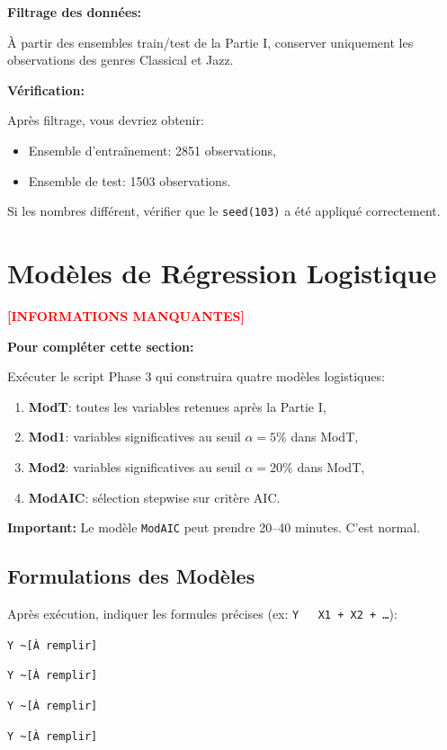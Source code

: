 \documentclass[11pt,a4paper,french]{report}
\begin{document}
\textbf{Filtrage des données:}

À partir des ensembles train/test de la Partie I, conserver uniquement les observations des genres Classical et Jazz.

\textbf{Vérification:}

Après filtrage, vous devriez obtenir:
\begin{itemize}
    \item Ensemble d'entraînement: 2851 observations,
    \item Ensemble de test: 1503 observations.
\end{itemize}

Si les nombres différent, vérifier que le \texttt{seed(103)} a été appliqué correctement.

\section{Modèles de Régression Logistique}

\textcolor{red}{\textbf{[INFORMATIONS MANQUANTES]}}

\textbf{Pour compléter cette section:}

Exécuter le script Phase 3 qui construira quatre modèles logistiques:

\begin{enumerate}
    \item \textbf{ModT}: toutes les variables retenues après la Partie I,
    \item \textbf{Mod1}: variables significatives au seuil $\alpha = 5\%$ dans ModT,
    \item \textbf{Mod2}: variables significatives au seuil $\alpha = 20\%$ dans ModT,
    \item \textbf{ModAIC}: sélection stepwise sur critère AIC.
\end{enumerate}

\textbf{Important:} Le modèle \texttt{ModAIC} peut prendre 20--40 minutes. C'est normal.

\subsection{Formulations des Modèles}

Après exécution, indiquer les formules précises (ex: \texttt{Y ~ X1 + X2 + \ldots}):

\begin{description}[labelwidth=2.5cm]
    \item[ModT:] \texttt{Y \textasciitilde [À remplir]}
    \item[Mod1:] \texttt{Y \textasciitilde [À remplir]}
    \item[Mod2:] \texttt{Y \textasciitilde [À remplir]}
    \item[ModAIC:] \texttt{Y \textasciitilde [À remplir]}
\end{description}
\end{document}
